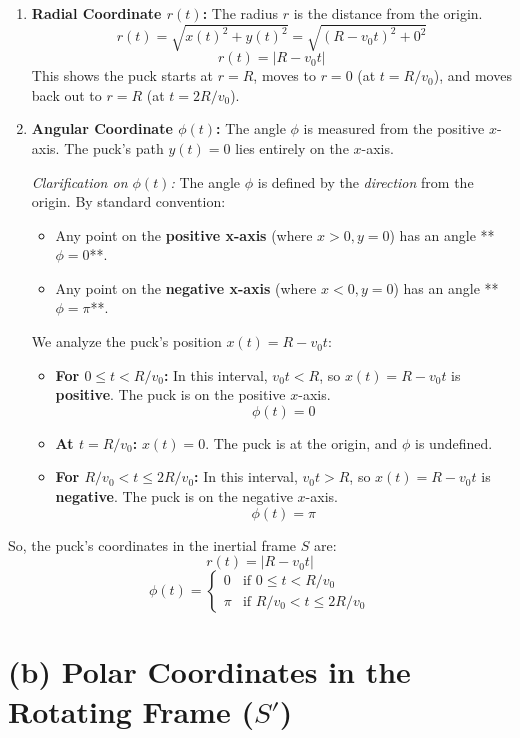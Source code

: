 \documentclass[11pt, a4paper]{article} %
\begin{document}
\begin{enumerate}
    \item \textbf{Radial Coordinate $r(t)$:}
    The radius $r$ is the distance from the origin.
    $$r(t) = \sqrt{x(t)^2 + y(t)^2} = \sqrt{(R - v_0 t)^2 + 0^2}$$
    $$r(t) = |R - v_0 t|$$
    This shows the puck starts at $r=R$, moves to $r=0$ (at $t=R/v_0$), and moves back out to $r=R$ (at $t=2R/v_0$).

    \item \textbf{Angular Coordinate $\phi(t)$:}
    The angle $\phi$ is measured from the positive $x$-axis. The puck's path $y(t)=0$ lies entirely on the $x$-axis.
    
    \textit{Clarification on $\phi(t)$:} The angle $\phi$ is defined by the \textit{direction} from the origin. By standard convention:
    \begin{itemize}
        \item Any point on the \textbf{positive x-axis} (where $x>0, y=0$) has an angle **$\phi = 0$**.
        \item Any point on the \textbf{negative x-axis} (where $x<0, y=0$) has an angle **$\phi = \pi$**.
    \end{itemize}
    We analyze the puck's position $x(t) = R - v_0 t$:
    \begin{itemize}
        \item \textbf{For $0 \le t < R/v_0$:}
        In this interval, $v_0 t < R$, so $x(t) = R - v_0 t$ is \textbf{positive}. The puck is on the positive $x$-axis.
        $$\phi(t) = 0$$
        \item \textbf{At $t = R/v_0$:}
        $x(t) = 0$. The puck is at the origin, and $\phi$ is undefined.
        \item \textbf{For $R/v_0 < t \le 2R/v_0$:}
        In this interval, $v_0 t > R$, so $x(t) = R - v_0 t$ is \textbf{negative}. The puck is on the negative $x$-axis.
        $$\phi(t) = \pi$$
    \end{itemize}
\end{enumerate}

So, the puck's coordinates in the inertial frame $S$ are:
$$r(t) = |R - v_0 t|$$
$$\phi(t) = \begin{cases} 0 & \text{if } 0 \le t < R/v_0 \\ \pi & \text{if } R/v_0 < t \le 2R/v_0 \end{cases}$$

\hrulefill

\section*{(b) Polar Coordinates in the Rotating Frame ($S'$)}
\end{document}
